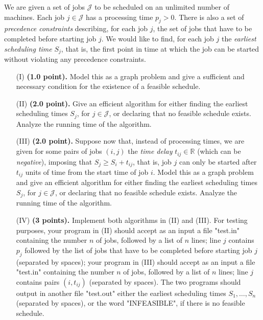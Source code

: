 \documentclass{article}
\begin{document}
\medskip

 We are given a set of jobs $\mathcal{J}$ to be
scheduled on an unlimited number of machines. Each job $j\in
\mathcal{J}$ has a processing time $p_j> 0$. There is also a set of
{\it precedence constraints} describing, for each job $j$, the set of
jobs that have to be completed before starting job $j$. We would like
to find, for each job $j$ the {\it earliest scheduling time} $S_j$,
that is, the first point in time at which the job can be started
without violating any precedence constraints. 

\begin{enumerate}
\item[(I)]  {\bf (1.0 point).} Model this as a graph problem and give
  a sufficient and necessary condition for the existence of a feasible
  schedule. 
\item[(II)]  {\bf (2.0 point).} Give an efficient algorithm for either
  finding the earliest scheduling times $S_j$, for $j\in\mathcal{J}$,
  or declaring that no feasible schedule exists. Analyze the running
  time of the algorithm. 
\item[(III)] {\bf (2.0 point).} Suppose now that, instead of
  processing times, we are given for some pairs of jobs $(i,j)$ the
  {\it time delay} $t_{ij}\in\mathbb{R}$ (which can be {\it
    negative}),  imposing that $S_j\ge S_i+t_{ij}$, that is, job $j$
  can only be started after $t_{ij}$ units of time from the start time
  of job $i$. Model this as a graph problem and give an efficient
  algorithm for either finding the earliest scheduling times $S_j$,
  for $j\in\mathcal{J}$, or declaring that no feasible schedule
  exists. Analyze the running time of the algorithm. 
\item[(IV)]  {\bf (3 points).} Implement both algorithms in (II) and
  (III). For testing purposes, your program in (II) should accept as
  an input a file "test.in" containing the number $n$ of jobs,
  followed by a list of $n$ lines; line $j$ contains $p_j$ followed by
  the list of jobs that have to be completed before starting job $j$
  (separated by spaces); your program in (III) should accept as an
  input a file "test.in" containing the number $n$ of jobs, followed
  by a list of $n$ lines; line $j$ contains pairs $(i,t_{ij})$
  (separated by spaces).  The two programs should output in another
  file "test.out" either the earliest scheduling times
  $S_1,\ldots,S_n$ (separated by spaces), or the word "INFEASIBLE", if
  there is no feasible schedule.  
\end{enumerate}
\end{document}
